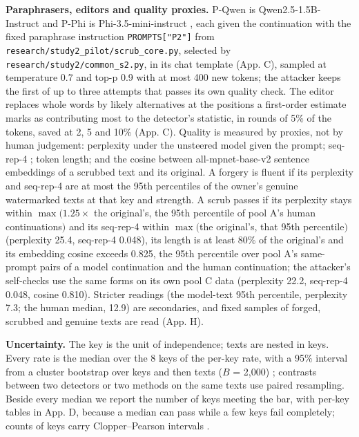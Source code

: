 \documentclass[11pt,letterpaper]{article}
\begin{document}
\textbf{Paraphrasers, editors and quality proxies.} P-Qwen is Qwen2.5-1.5B-Instruct \citep{qwen2024card15binstruct} and P-Phi is Phi-3.5-mini-instruct \citep{abdin2024phi3}, each given the continuation with the fixed paraphrase instruction \texttt{PROMPTS{[}"P2"{]}} from \texttt{research/\allowbreak{}study2\_\allowbreak{}pilot/\allowbreak{}scrub\_\allowbreak{}core.\allowbreak{}py}, selected by \texttt{research/\allowbreak{}study2/\allowbreak{}common\_\allowbreak{}s2.\allowbreak{}py}, in its chat template (App. C), sampled at temperature 0.7 and top-p 0.9 with at most 400 new tokens; the attacker keeps the first of up to three attempts that passes its own quality check. The editor replaces whole words by likely alternatives at the positions a first-order estimate marks as contributing most to the detector's statistic, in rounds of 5\% of the tokens, saved at 2, 5 and 10\% (App. C). Quality is measured by proxies, not by human judgement: perplexity under the unsteered model given the prompt; seq-rep-4 \citep{welleck2020unlikelihood}; token length; and the cosine between all-mpnet-base-v2 sentence embeddings \citep{reimers2019sbert} of a scrubbed text and its original. A forgery is fluent if its perplexity and seq-rep-4 are at most the 95th percentiles of the owner's genuine watermarked texts at that key and strength. A scrub passes if its perplexity stays within \(\max(1.25 \times\) the original's, the 95th percentile of pool A's human continuations\()\) and its seq-rep-4 within \(\max(\)the original's, that 95th percentile\()\) (perplexity 25.4, seq-rep-4 0.048), its length is at least 80\% of the original's and its embedding cosine exceeds 0.825, the 95th percentile over pool A's same-prompt pairs of a model continuation and the human continuation; the attacker's self-checks use the same forms on its own pool C data (perplexity 22.2, seq-rep-4 0.048, cosine 0.810). Stricter readings (the model-text 95th percentile, perplexity 7.3; the human median, 12.9) are secondaries, and fixed samples of forged, scrubbed and genuine texts are read (App. H).

\textbf{Uncertainty.} The key is the unit of independence; texts are nested in keys. Every rate is the median over the 8 keys of the per-key rate, with a 95\% interval from a cluster bootstrap over keys and then texts (\(B\) = 2,000) \citep{davison1997bootstrap}; contrasts between two detectors or two methods on the same texts use paired resampling. Beside every median we report the number of keys meeting the bar, with per-key tables in App. D, because a median can pass while a few keys fail completely; counts of keys carry Clopper--Pearson intervals \citep{clopper1934binomial}.
\end{document}

